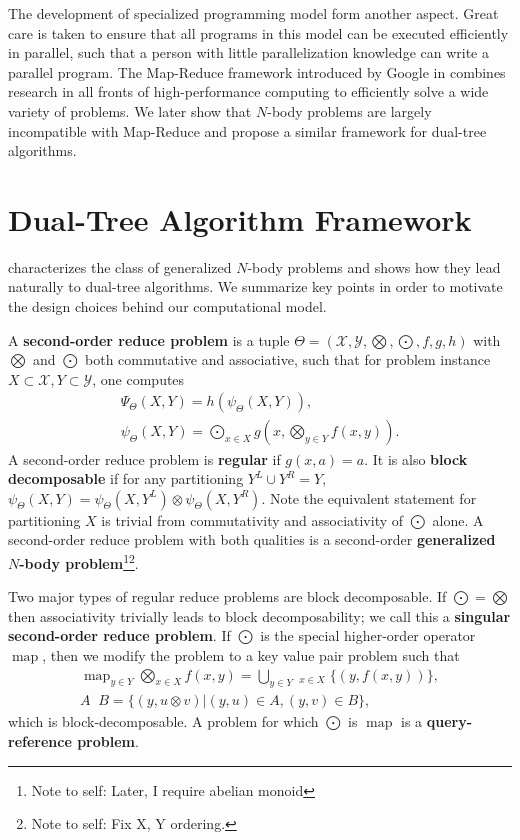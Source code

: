 \documentclass[times, leqno,twocolumn]{article}
\newcommand{\authornote}[1]{\footnote{Note to self: #1}}
\newcommand{\authorsnote}[1]{\authornote{#1}}
\newcommand{\union}{\cup}
\newcommand{\Union}{\bigcup}
\newcommand{\bigvec}[1]{\mathop{\overrightarrow{#1}}}
\DeclareMathOperator*{\map}{map}
\newcommand{\Gnp}{\Psi_{\Theta}}
\newcommand{\gnp}{\psi_{\Theta}}
\newcommand{\defterm}[1]{{\bf #1}}
\newcommand{\kdleft}[1]{#1^{\!L}}
\newcommand{\kdright}[1]{#1^{\!R}}
\begin{document}
The development of specialized programming model form another aspect.
Great care is taken to ensure that all programs in this model can be executed efficiently in parallel, such that a person with little parallelization knowledge can write a parallel program.
The Map-Reduce framework introduced by Google in \cite{mapreduce} combines research in all fronts of high-performance computing to efficiently solve a wide variety of problems.
We later show that $N$-body problems are largely incompatible with Map-Reduce and propose a similar framework for dual-tree algorithms.

\section{Dual-Tree Algorithm Framework}

\cite{ryan_nips} characterizes the class of generalized $N$-body problems and shows how they lead naturally to dual-tree algorithms.
We summarize key points in order to motivate the design choices behind our computational model.

A \defterm{second-order reduce problem} is a tuple $\Theta = (\mathcal{X}, \mathcal{Y}, \bigotimes, \bigodot, f, g, h)$ with $\bigotimes$ and $\bigodot$ both commutative and associative, such that for problem instance $X \subset {\mathcal{X}}, Y \subset {\mathcal{Y}}$, one computes
\[\begin{array}{l}
  \displaystyle \Gnp(X, Y) = h(\gnp(X, Y)),
  \\
  \displaystyle \gnp(X, Y) = \bigodot_{x \in X} g\!\left(x, \bigotimes_{y \in Y} f(x, y) \right).
\end{array}\]
\noindent A second-order reduce problem is \defterm{regular} if $g(x, a) = a$.
It is also \defterm{block decomposable} if for any partitioning $\kdleft{Y} \union \kdright{Y} = Y$, $\gnp(X,Y) = \gnp(X,\kdleft{Y}) \otimes \gnp(X,\kdright{Y})$.
Note the equivalent statement for partitioning $X$ is trivial from commutativity and associativity of $\bigodot$ alone.
A second-order reduce problem with both qualities is a second-order \defterm{generalized $N$-body problem}\authorsnote{Later, I require abelian monoid}\authorsnote{Fix X, Y ordering.}.

Two major types of regular reduce problems are block decomposable.
If $\bigodot = \bigotimes$ then associativity trivially leads to block decomposability; we call this a \defterm{singular second-order reduce problem}.
If $\bigodot$ is the special higher-order operator $\map$, then we modify the problem to a key value pair problem such that
\[\begin{array}{c}
  \displaystyle \map_{y \in Y} \bigotimes_{x \in X} f(x, y) = \Union_{y \in Y} \bigvec{\bigotimes}_{x \in X} \{(y, f(x, y))\},
  \\
  A \bigvec{\otimes} B = \{(y, u \otimes v) | (y,u) \in A, (y,v) \in B\},
\end{array}\]
\noindent which is block-decomposable.
A problem for which $\bigodot$ is $\map$ is a \defterm{query-reference problem}.
\end{document}
